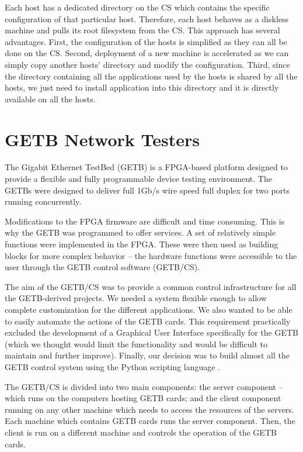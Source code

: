 Each host has a dedicated directory on the CS which contains the specific
configuration of that particular host. Therefore, each host behaves as a
diskless machine and pulls its root filesystem from the CS. This approach has
several advantages. First, the configuration of the hosts is simplified as
they can all be done on the CS. Second, deployment of a new machine is accelerated as
we can simply copy another hosts' directory and modify the configuration. Third,
since the directory containing all the applications used by the hosts is shared
by all the hosts, we just need to install application into this directory and
it is directly available on all the hosts.

\section{GETB Network Testers}
\label{sect:GETB}

The Gigabit Ethernet TestBed \cite{GETB} (GETB) is a FPGA-based platform
designed to provide a flexible and fully programmable device testing environment.
The GETBs were designed to deliver full 1Gb/s wire speed full duplex for two ports running concurrently.

Modifications to the FPGA firmware are difficult and time consuming. This is why
the GETB was programmed to offer services. A set of relatively simple
functions were implemented in the FPGA. These were then used as building blocks
for more complex behavior – the hardware functions were accessible to the user
through the GETB control software (GETB/CS).
   
The aim of the GETB/CS was to provide a common control infrastructure for all
the GETB-derived projects. We needed a system flexible enough to allow complete
customization for the different applications. We also wanted to be able to
easily automate the actions of the GETB cards. This requirement practically
excluded the development of a Graphical User Interface specifically for the
GETB (which we thought would limit the functionality and would be difficult
to maintain and further improve). Finally, our decision was to build almost all
the GETB control system using the Python scripting language \cite{Python}.

The GETB/CS is divided into two main components: the server component – which
runs on the computers hosting GETB cards; and the client component running on
any other machine which needs to access the resources of the servers. Each
machine which contains GETB cards runs the server component. Then, the client
is run on a different machine and controls the operation of the GETB cards.

